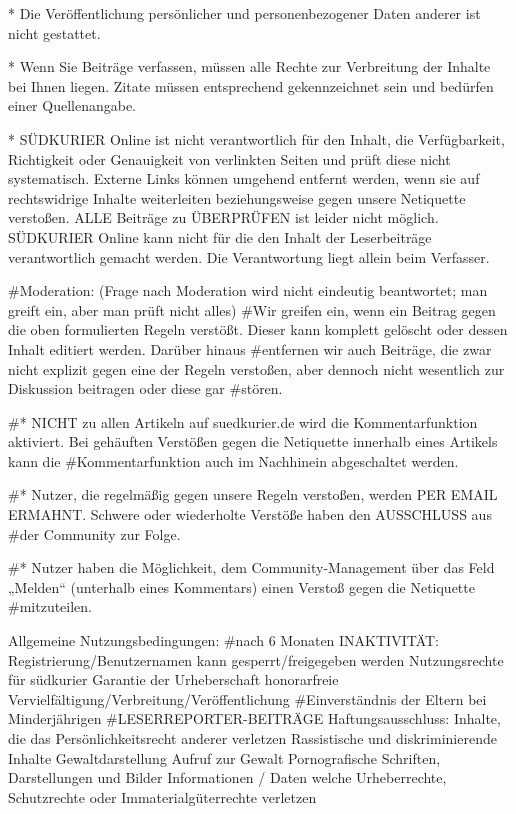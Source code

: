 * Die Veröffentlichung persönlicher und personenbezogener Daten anderer ist nicht gestattet.

* Wenn Sie Beiträge verfassen, müssen alle Rechte zur Verbreitung der Inhalte bei Ihnen liegen. Zitate müssen entsprechend gekennzeichnet sein und bedürfen einer Quellenangabe.

* SÜDKURIER Online ist nicht verantwortlich für den Inhalt, die Verfügbarkeit, Richtigkeit oder Genauigkeit von verlinkten Seiten und prüft diese nicht systematisch. Externe Links können umgehend entfernt werden, wenn sie auf rechtswidrige Inhalte weiterleiten beziehungsweise gegen unsere Netiquette verstoßen.
ALLE Beiträge zu ÜBERPRÜFEN ist leider nicht möglich. SÜDKURIER Online kann nicht für die den Inhalt der Leserbeiträge verantwortlich gemacht werden. Die Verantwortung liegt allein beim Verfasser.

#Moderation: (Frage nach Moderation wird nicht eindeutig beantwortet; man greift ein, aber man prüft nicht alles)
#Wir greifen ein, wenn ein Beitrag gegen die oben formulierten Regeln verstößt. Dieser kann komplett gelöscht oder dessen Inhalt editiert werden. Darüber hinaus #entfernen wir auch Beiträge, die zwar nicht explizit gegen eine der Regeln verstoßen, aber dennoch nicht wesentlich zur Diskussion beitragen oder diese gar #stören.

#* NICHT zu allen Artikeln auf suedkurier.de wird die Kommentarfunktion aktiviert. Bei gehäuften Verstößen gegen die Netiquette innerhalb eines Artikels kann die #Kommentarfunktion auch im Nachhinein abgeschaltet werden.

#* Nutzer, die regelmäßig gegen unsere Regeln verstoßen, werden PER EMAIL ERMAHNT. Schwere oder wiederholte Verstöße haben den AUSSCHLUSS aus #der Community zur Folge.

#* Nutzer haben die Möglichkeit, dem Community-Management über das Feld „Melden“ (unterhalb eines Kommentars) einen Verstoß gegen die Netiquette #mitzuteilen.


Allgemeine Nutzungsbedingungen:
#nach 6 Monaten INAKTIVITÄT: Registrierung/Benutzernamen kann gesperrt/freigegeben werden
Nutzungsrechte für südkurier
Garantie der Urheberschaft
honorarfreie Vervielfältigung/Verbreitung/Veröffentlichung
#Einverständnis der Eltern bei Minderjährigen
#LESERREPORTER-BEITRÄGE
Haftungsausschluss: 
    Inhalte, die das Persönlichkeitsrecht anderer verletzen
    Rassistische und diskriminierende Inhalte
    Gewaltdarstellung
    Aufruf zur Gewalt
    Pornografische Schriften, Darstellungen und Bilder
    Informationen / Daten welche Urheberrechte, Schutzrechte oder Immaterialgüterrechte verletzen

